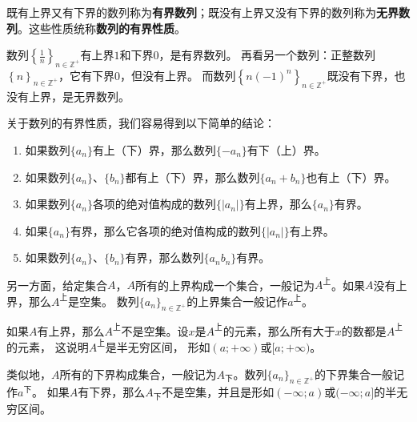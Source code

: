 \documentclass[12pt,UTF8]{ctexbook}
\begin{document}
既有上界又有下界的数列称为\textbf{有界数列}；既没有上界又没有下界的数列称为\textbf{无界数列}。这些性质统称\textbf{数列的有界性质}。

数列$\left\{\frac{1}{n}\right\}_{n\in\mathbb{Z}^+}$有上界$1$和下界$0$，是有界数列。
再看另一个数列：正整数列$\left\{n\right\}_{n\in\mathbb{Z}^+}$，它有下界$0$，但没有上界。
而数列$\left\{n(-1)^n\right\}_{n\in\mathbb{Z}^+}$既没有下界，也没有上界，是无界数列。

关于数列的有界性质，我们容易得到以下简单的结论：
\begin{enumerate}
    \item 如果数列$\{a_n\}$有上（下）界，那么数列$\{-a_n\}$有下（上）界。
    \item 如果数列$\{a_n\}$、$\{b_n\}$都有上（下）界，那么数列$\{a_n + b_n\}$也有上（下）界。
    \item 如果数列$\{a_n\}$各项的绝对值构成的数列$\{|a_n|\}$有上界，那么$\{a_n\}$有界。
    \item 如果$\{a_n\}$有界，那么它各项的绝对值构成的数列$\{|a_n|\}$有上界。
    \item 如果数列$\{a_n\}$、$\{b_n\}$有界，那么数列$\{a_n b_n\}$有界。
\end{enumerate}

另一方面，给定集合$A$，$A$所有的上界构成一个集合，一般记为$A^{\text{上}}$。如果$A$没有上界，那么$A^{\text{上}}$是空集。
数列$\{a_n\}_{n\in\mathbb{Z}^+}$的上界集合一般记作$a^{\text{上}}$。

如果$A$有上界，那么$A^{\text{上}}$不是空集。设$x$是$A^{\text{上}}$的元素，那么所有大于$x$的数都是$A^{\text{上}}$的元素，
这说明$A^{\text{上}}$是半无穷区间，
形如$(a; +\infty)$或$[a;+\infty)$。

类似地，$A$所有的下界构成集合，一般记为$A_{\text{下}}$。数列$\{a_n\}_{n\in\mathbb{Z}^+}$的下界集合一般记作$a^{\text{下}}$。
如果$A$有下界，那么$A_{\text{下}}$不是空集，并且是形如$(-\infty; a)$或$(-\infty; a]$的半无穷区间。
\end{document}
